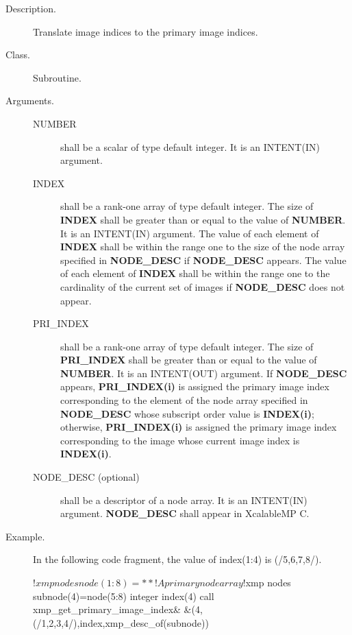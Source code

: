 \begin{description}
 \item[Description.] Translate image indices to the primary image indices.

 \item[Class.] Subroutine.
	    
 \item[Arguments.] \hspace{1cm}
	    \begin{description}
	     \item[NUMBER] shall be a scalar of type default integer. It
			is an INTENT(IN) argument.
	     \item[INDEX] shall be a rank-one array of type default integer.
			The size of {\bfseries INDEX} shall be
			greater than or equal to the value of {\bfseries NUMBER}.
			It is an INTENT(IN) argument.
			The value of each element of {\bfseries INDEX} shall be
					within 
			the range one
			to the size of the node array specified 
			in {\bfseries NODE\_DESC} if {\bfseries NODE\_DESC} appears.
			The value of each element of {\bfseries INDEX} shall be
					within 
			the range one
			to the cardinality of the current set of images
			if {\bfseries NODE\_DESC} does not appear.
	     \item[PRI\_INDEX] shall be a rank-one array of type default integer.
			The size of {\bfseries PRI\_INDEX} shall be
			greater than or equal to the value of {\bfseries NUMBER}.
			It is an INTENT(OUT) argument.
			If {\bfseries NODE\_DESC} appears,
			{\bfseries PRI\_INDEX(i)} is assigned the primary image index
			corresponding to the element of the node array
			specified in {\bfseries NODE\_DESC}
			whose subscript order value is {\bfseries INDEX(i)}; otherwise,
			{\bfseries PRI\_INDEX(i)} is assigned the primary image index
			corresponding to the image whose
			current image index is {\bfseries INDEX(i)}.
	     \item[NODE\_DESC (optional)] shall be a descriptor of a
			node array. It is an INTENT(IN) argument.
			{\bfseries NODE\_DESC} shall appear in XcalableMP C.
	    \end{description}

 \item[Example.] 
In the following code fragment, the value of {\ttfamily index(1:4)} is {\ttfamily (/5,6,7,8/)}.
\begin{XFexample}
!$xmp nodes node(1:8)=**        ! A primary node array
!$xmp nodes subnode(4)=node(5:8)
      integer index(4)
      call xmp_get_primary_image_index&
           &(4,(/1,2,3,4/),index,xmp_desc_of(subnode))
\end{XFexample}
\end{description}


